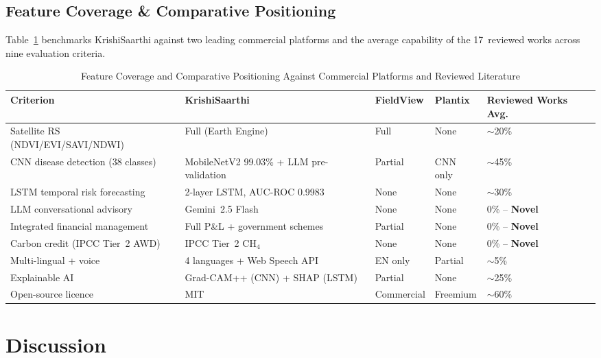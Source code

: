 \documentclass[conference]{IEEEtran}
\begin{document}
\subsection{Feature Coverage \& Comparative Positioning}

Table~\ref{tab:comparison} benchmarks KrishiSaarthi against two leading commercial platforms and the average capability of the 17~reviewed works across nine evaluation criteria.

\begin{table}[!ht]
\caption{Feature Coverage and Comparative Positioning Against Commercial Platforms and Reviewed Literature}
\label{tab:comparison}
\centering
\renewcommand{\arraystretch}{1.2}
\begin{tabular}{|p{3.2cm}|p{2.5cm}|p{2.0cm}|p{1.8cm}|p{2.5cm}|}
\hline
\textbf{Criterion} & \textbf{KrishiSaarthi} & \textbf{FieldView} & \textbf{Plantix} & \textbf{Reviewed Works Avg.} \\
\hline
Satellite RS (NDVI/EVI/SAVI/NDWI) & Full (Earth Engine) & Full & None & $\sim$20\% \\
\hline
CNN disease detection (38 classes) & MobileNetV2 99.03\% + LLM pre-validation & Partial & CNN only & $\sim$45\% \\
\hline
LSTM temporal risk forecasting & 2-layer LSTM, AUC-ROC 0.9983 & None & None & $\sim$30\% \\
\hline
LLM conversational advisory & Gemini~2.5 Flash & None & None & 0\% -- \textbf{Novel} \\
\hline
Integrated financial management & Full P\&L + government schemes & Partial & None & 0\% -- \textbf{Novel} \\
\hline
Carbon credit (IPCC Tier~2 AWD) & IPCC Tier~2 CH$_4$ & None & None & 0\% -- \textbf{Novel} \\
\hline
Multi-lingual + voice & 4 languages + Web Speech API & EN only & Partial & $\sim$5\% \\
\hline
Explainable AI & Grad-CAM++ (CNN) + SHAP (LSTM) & Partial & None & $\sim$25\% \\
\hline
Open-source licence & MIT & Commercial & Freemium & $\sim$60\% \\
\hline
\end{tabular}
\end{table}

\section{Discussion}
\label{sec:discussion}
\end{document}
